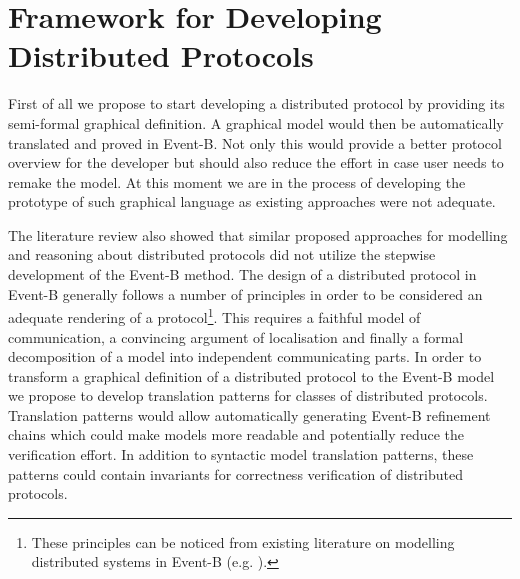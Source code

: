 \documentclass{llncs}
\begin{document}
	

	
	
	
	



\section{Framework for Developing Distributed Protocols}
	First of all we propose to start developing a distributed protocol by providing its semi-formal graphical definition. A graphical model would then be automatically translated and proved in Event-B. Not only this would provide a better protocol overview for the developer but should also reduce the effort in case user needs to remake the model. At this moment we are in the process of developing the prototype of such graphical language as existing approaches were not adequate. 
	
	The literature review also showed that similar proposed approaches for modelling and reasoning about distributed protocols did not utilize the stepwise development of the Event-B method. The design of a distributed protocol in Event-B generally follows a number of principles in order to be considered an adequate rendering of a protocol\footnote{These principles can be noticed from existing literature on modelling distributed systems in Event-B (e.g. \cite{Cansell} \cite{Hoang} \cite{Yadav}).}. This requires a faithful model of communication, a convincing argument of localisation and finally a formal decomposition of a model into independent communicating parts. In order to transform a graphical definition of a distributed protocol to the Event-B model we propose to develop translation patterns for classes of distributed protocols. Translation patterns would allow automatically generating Event-B refinement chains which could make models more readable and potentially reduce the verification effort. In addition to syntactic model translation patterns, these patterns could contain invariants for correctness verification of distributed protocols. 
\end{document}
